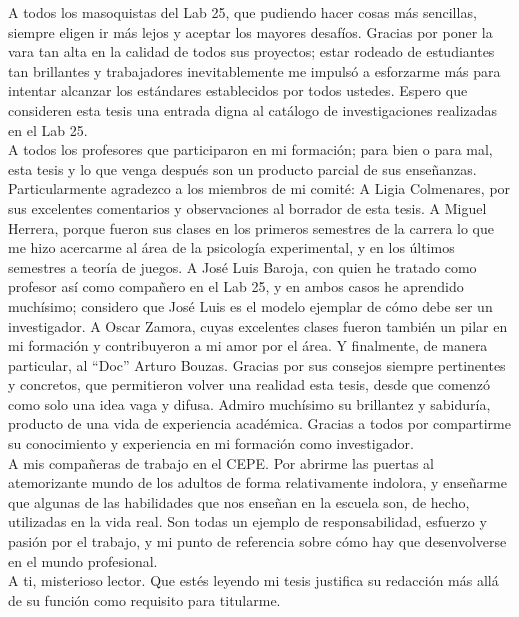 \documentclass[
12pt, %
spanish, %
onehalfspacing, %
headsepline, %
]{MastersDoctoralThesis} %
\begin{document}
\begin{acknowledgements}
A todos los masoquistas del Lab 25, que pudiendo hacer cosas más sencillas, siempre eligen ir más lejos y aceptar los mayores desafíos. Gracias por poner la vara tan alta en la calidad de todos sus proyectos; estar rodeado de estudiantes tan brillantes y trabajadores inevitablemente me impulsó a esforzarme más para intentar alcanzar los estándares establecidos por todos ustedes. Espero que consideren esta tesis una entrada digna al catálogo de investigaciones realizadas en el Lab 25.\\

A todos los profesores que participaron en mi formación; para bien o para mal, esta tesis y lo que venga después son un producto parcial de sus enseñanzas. Particularmente agradezco a los miembros de mi comité: A Ligia Colmenares, por sus excelentes comentarios y observaciones al borrador de esta tesis. A Miguel Herrera, porque fueron sus clases en los primeros semestres de la carrera lo que me hizo acercarme al área de la psicología experimental, y en los últimos semestres a teoría de juegos. A José Luis Baroja, con quien he tratado como profesor así como compañero en el Lab 25, y en ambos casos he aprendido muchísimo; considero que José Luis es el modelo ejemplar de cómo debe ser un investigador. A Oscar Zamora, cuyas excelentes clases fueron también un pilar en mi formación y contribuyeron a mi amor por el área. Y finalmente, de manera particular, al “Doc” Arturo Bouzas. Gracias por sus consejos siempre pertinentes y concretos, que permitieron volver una realidad esta tesis, desde que comenzó como solo una idea vaga y difusa. Admiro muchísimo su brillantez y sabiduría, producto de una vida de experiencia académica. Gracias a todos por compartirme su conocimiento y experiencia en mi formación como investigador.\\

A mis compañeras de trabajo en el CEPE. Por abrirme las puertas al atemorizante mundo de los adultos de forma relativamente indolora, y enseñarme que algunas de las habilidades que nos enseñan en la escuela son, de hecho, utilizadas en la vida real. Son todas un ejemplo de responsabilidad, esfuerzo y pasión por el trabajo, y mi punto de referencia sobre cómo hay que desenvolverse en el mundo profesional.\\

A ti, misterioso lector. Que estés leyendo mi tesis justifica su redacción más allá de su función como requisito para titularme.\\
\end{acknowledgements}
\end{document}
